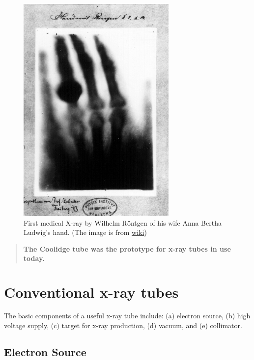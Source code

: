 \documentclass[]{book}
\theoremstyle{definition}
\theoremstyle{definition}
\theoremstyle{definition}
\theoremstyle{remark}
\begin{document}
\begin{figure}
\centering
\includegraphics{figures/x-ray_hand.jpg}
\caption{First medical X-ray by Wilhelm Röntgen of his wife Anna Bertha
Ludwig's hand. (The image is from
\href{https://en.wikipedia.org/wiki/Wilhelm_Röntgen}{wiki})}
\end{figure}

\begin{quote}
\textbf{The Coolidge tube was the prototype for x-ray tubes in use
today.}
\end{quote}

\section{Conventional x-ray tubes}\label{conventional-x-ray-tubes}

The basic components of a useful x-ray tube include: (a) electron
source, (b) high voltage supply, (c) target for x-ray production, (d)
vacuum, and (e) collimator.

\subsection{Electron Source}\label{electron-source}
\end{document}
